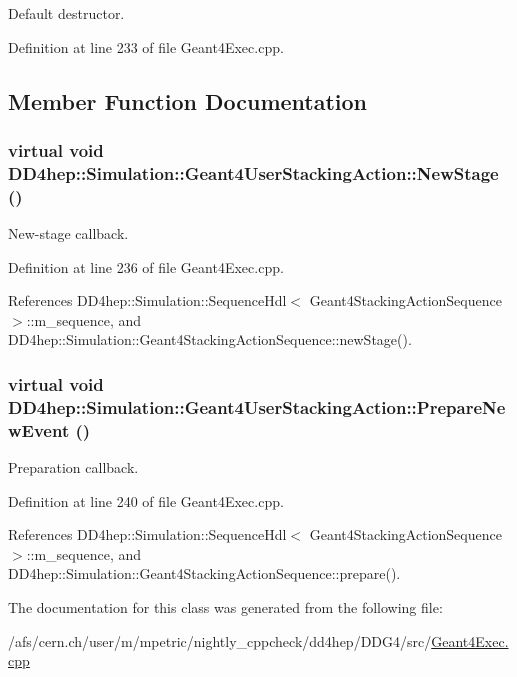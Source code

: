 Default destructor. 

Definition at line 233 of file Geant4Exec.cpp.

\subsection{Member Function Documentation}
\hypertarget{class_d_d4hep_1_1_simulation_1_1_geant4_user_stacking_action_ae8abf4d3f1981b66637e9ceffbc9c604}{
\subsubsection[{NewStage}]{\setlength{\rightskip}{0pt plus 5cm}virtual void DD4hep::Simulation::Geant4UserStackingAction::NewStage ()}}
\label{class_d_d4hep_1_1_simulation_1_1_geant4_user_stacking_action_ae8abf4d3f1981b66637e9ceffbc9c604}


New-\/stage callback. 

Definition at line 236 of file Geant4Exec.cpp.

References DD4hep::Simulation::SequenceHdl$<$ Geant4StackingActionSequence $>$::m\_\-sequence, and DD4hep::Simulation::Geant4StackingActionSequence::newStage().\hypertarget{class_d_d4hep_1_1_simulation_1_1_geant4_user_stacking_action_a565c100df77dc0bdfe343a424285cdab}{
\subsubsection[{PrepareNewEvent}]{\setlength{\rightskip}{0pt plus 5cm}virtual void DD4hep::Simulation::Geant4UserStackingAction::PrepareNewEvent ()}}
\label{class_d_d4hep_1_1_simulation_1_1_geant4_user_stacking_action_a565c100df77dc0bdfe343a424285cdab}


Preparation callback. 

Definition at line 240 of file Geant4Exec.cpp.

References DD4hep::Simulation::SequenceHdl$<$ Geant4StackingActionSequence $>$::m\_\-sequence, and DD4hep::Simulation::Geant4StackingActionSequence::prepare().

The documentation for this class was generated from the following file:\begin{DoxyCompactItemize}
\item 
/afs/cern.ch/user/m/mpetric/nightly\_\-cppcheck/dd4hep/DDG4/src/\hyperlink{_geant4_exec_8cpp}{Geant4Exec.cpp}\end{DoxyCompactItemize}
